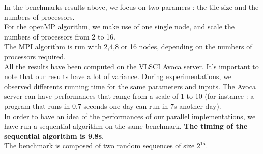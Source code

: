 
In the benchmarks results above, we focus on two paramers : the tile size and the numbers of processors. \\
For the openMP algorithm, we make use of one single node, and scale the numbers of processors from 2 to 16. \\
The MPI algorithm is run with 2,4,8 or 16 nodes, depending on the numbers of processors required. \\
All the results have been computed on the VLSCI Avoca server. It's important to note that our results have a lot of variance. During experimentations, we observed differents running time for the same parameters and inputs. The Avoca server can have performances that range from a scale of 1 to 10 (for instance : a program that runs in 0.7 seconds one day can run in 7s another day).\\
In order to have an idea of the performances of our parallel implementations, we have run a sequential algorithm on the same benchmark. \textbf{The timing of the sequential algorithm is 9.8s}.
\\
The benchmark is composed of two random sequences of size $2^{15}$.